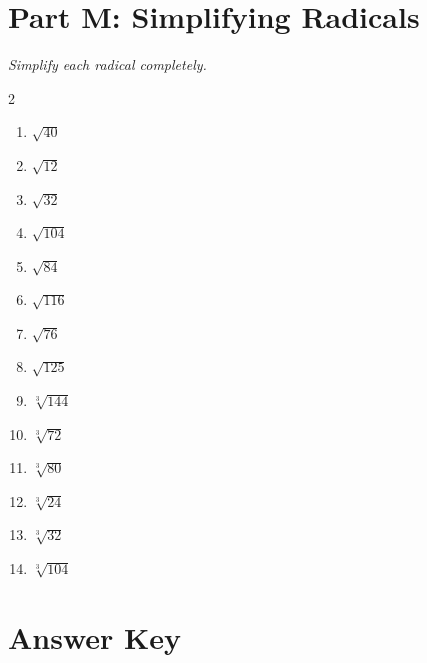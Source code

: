 \documentclass[11pt]{article}
\begin{document}
\section*{Part M: Simplifying Radicals}
\noindent\textit{Simplify each radical completely.}
\begin{multicols}{2}
\begin{enumerate}
  \item $\sqrt{40}$
  \vspace{1.3cm}
  \item $\sqrt{12}$
  \vspace{1.3cm}
  \item $\sqrt{32}$
  \vspace{1.3cm}
  \item $\sqrt{104}$
  \vspace{1.3cm}
  \item $\sqrt{84}$
  \vspace{1.3cm}
  \item $\sqrt{116}$
  \vspace{1.3cm}
  \item $\sqrt{76}$
  \vspace{1.3cm}
  \item $\sqrt{125}$
  \vspace{1.3cm}
  \item $\sqrt[3]{144}$
  \vspace{1.3cm}
  \item $\sqrt[3]{72}$
  \vspace{1.3cm}
  \item $\sqrt[3]{80}$
  \vspace{1.3cm}
  \item $\sqrt[3]{24}$
  \vspace{1.3cm}
  \item $\sqrt[3]{32}$
  \vspace{1.3cm}
  \item $\sqrt[3]{104}$
  \vspace{1.3cm}
\end{enumerate}
\end{multicols}

\newpage
{}
\section*{Answer Key}
\end{document}
